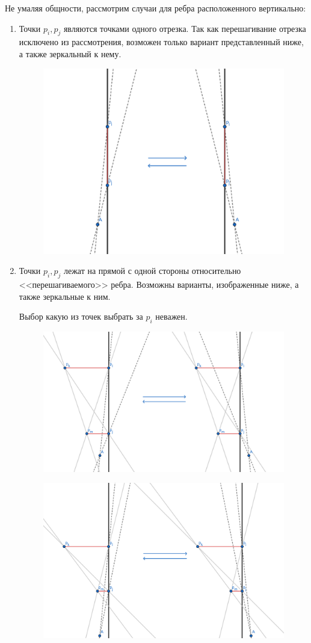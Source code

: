 \documentclass[letterpaper,12pt]{article}
\begin{document}
Не умаляя общности, рассмотрим случаи для ребра расположенного вертикально:
\begin{enumerate}
      \item Точки $p_i, p_j$ являются точками одного отрезка. 
            Так как перешагивание отрезка исключено из рассмотрения,
            возможен только вариант представленный ниже, а также
            зеркальный к нему.

            \begin{figure}[h]
                  \centering
                  \includegraphics[width=.5\linewidth]{one_segment_1.png}
            \end{figure}

      \item Точки $p_i, p_j$ лежат на прямой с одной стороны относительно
            <<перешагиваемого>> ребра. Возможны варианты, изображенные ниже,
            а также зеркальные к ним.

            Выбор какую из точек выбрать за $p_i$ неважен.

            \begin{figure}[H]
                  \centering
                  \includegraphics[width=.6\linewidth]{one_side_1.png}
            \end{figure}

            \begin{figure}[H]
                  \centering
                  \includegraphics[width=.6\linewidth]{one_side_3.png}
            \end{figure}


\end{enumerate}
\end{document}
